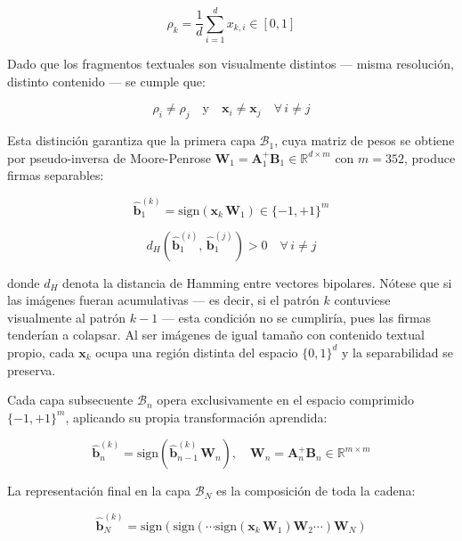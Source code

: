\documentclass[12pt]{article}
\begin{document}
\begin{equation}
	\rho_k = \frac{1}{d} \sum_{i=1}^{d} x_{k,i} \in [0, 1]
\end{equation}

Dado que los fragmentos textuales son visualmente distintos — misma resolución, distinto contenido —
se cumple que:

\begin{equation}
	\rho_i \neq \rho_j \quad \text{y} \quad
	\mathbf{x}_i \neq \mathbf{x}_j \quad \forall\, i \neq j
\end{equation}

Esta distinción garantiza que la primera capa $\mathcal{B}_1$, cuya matriz de pesos se obtiene por
pseudo-inversa de Moore-Penrose $\mathbf{W}_1 = \mathbf{A}_1^{+} \mathbf{B}_1 \in \mathbb{R}^{d \times m}$
con $m = 352$, produce firmas separables:

\begin{equation}
	\hat{\mathbf{b}}_1^{(k)} = \text{sign}\!\left(\mathbf{x}_k \, \mathbf{W}_1\right)
	\in \{-1, +1\}^{m}
\end{equation}

\begin{equation}
	d_H\!\left(\hat{\mathbf{b}}_1^{(i)},\, \hat{\mathbf{b}}_1^{(j)}\right) > 0
	\quad \forall\, i \neq j
\end{equation}

donde $d_H$ denota la distancia de Hamming entre vectores bipolares. Nótese que si las imágenes
fueran acumulativas — es decir, si el patrón $k$ contuviese visualmente al patrón $k-1$ — esta
condición no se cumpliría, pues las firmas tenderían a colapsar. Al ser imágenes de igual tamaño
con contenido textual propio, cada $\mathbf{x}_k$ ocupa una región distinta del espacio $\{0,1\}^d$
y la separabilidad se preserva.

Cada capa subsecuente $\mathcal{B}_n$ opera exclusivamente en el espacio comprimido
$\{-1,+1\}^m$, aplicando su propia transformación aprendida:

\begin{equation}
	\hat{\mathbf{b}}_n^{(k)} = \text{sign}\!\left(\hat{\mathbf{b}}_{n-1}^{(k)} \, \mathbf{W}_n\right),
	\quad \mathbf{W}_n = \mathbf{A}_n^{+} \mathbf{B}_n \in \mathbb{R}^{m \times m}
\end{equation}

La representación final en la capa $\mathcal{B}_N$ es la composición de toda la cadena:

\begin{equation}
	\hat{\mathbf{b}}_N^{(k)} = \text{sign}\!\left(
	\text{sign}\!\left( \cdots
	\text{sign}\!\left(\mathbf{x}_k \, \mathbf{W}_1\right)
	\mathbf{W}_2 \cdots \right)
	\mathbf{W}_N \right)
\end{equation}
\end{document}
